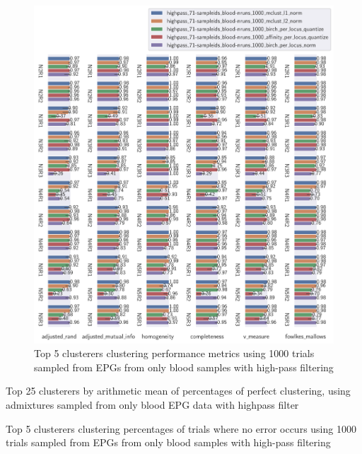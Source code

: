 \begin{theappendices}
\begin{figure}[H]
\centering
\includegraphics[width=\textwidth]{./figures/clust_comparison/highpass_71-sampleids_blood-nruns_1000_top_5_clusterers_by_metrics.pdf}
\caption{Top 5 clusterers clustering performance metrics using 1000 trials sampled from EPGs from only blood samples with high-pass filtering}
\label{fig:highpass_71-sampleids_blood-nruns_1000_top_5_clusterers_by_metrics}
\end{figure}

\begin{table}[H]
\centering
{}
\caption{Top 25 clusterers by arithmetic mean of percentages of perfect clustering, using admixtures sampled from only blood EPG data with highpass filter}
\label{table:top_25_not_ensemble_clusterers_by_binomial_confidence_highpass_71-sampleids_blood-nruns_1000}
\end{table}

\begin{table}[H]
\centering
{}
\caption{Top 5 clusterers clustering percentages of trials where no error occurs using 1000 trials sampled from EPGs from only blood samples with high-pass filtering}
\label{table:highpass_71-sampleids_blood-nruns_1000_top_5_clusterers_by_binomial_confidence}
\end{table}


\end{theappendices}
